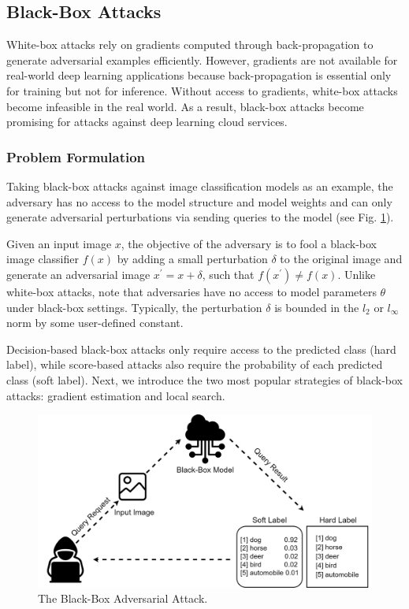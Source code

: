 
\subsection{Black-Box Attacks}
\label{sec:blackbox_attack}

White-box attacks rely on gradients computed through back-propagation to generate adversarial examples efficiently. However, gradients are not available for real-world deep learning applications because back-propagation is essential only for training but not for inference. Without access to gradients, white-box attacks become infeasible in the real world. As a result, black-box attacks become promising for attacks against deep learning cloud services.

\subsubsection{Problem Formulation}

Taking black-box attacks against image classification models as an example, the adversary has no access to the model structure and model weights and can only generate adversarial perturbations via sending queries to the model (see Fig. \ref{fig.decision}).
 
Given an input image $x$, the objective of the adversary is to fool a black-box image classifier $f(x)$ by adding a small perturbation $\delta$ to the original image and generate an adversarial image $x^{'} = x + \delta$, such that $f(x^{'}) \neq f(x)$. Unlike white-box attacks, note that adversaries have no access to model parameters $\theta$ under black-box settings. Typically, the perturbation $\delta$ is bounded in the $l_2$ or $l_{\infty}$ norm by some user-defined constant.

Decision-based black-box attacks only require access to the predicted class (hard label), while score-based attacks also require the probability of each predicted class (soft label).  Next, we introduce the two most popular strategies of black-box attacks: gradient estimation and local search.

\begin{figure}[H]
\centering
\includegraphics[width=\textwidth]{figures/chapter_intro/black-box.jpg}
\caption{The Black-Box Adversarial Attack.}
\label{fig.decision}
\end{figure}

